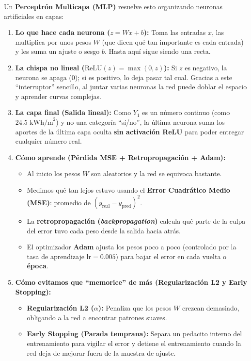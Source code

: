 \documentclass[11pt,a4paper]{article}
\begin{document}
Un \textbf{Perceptrón Multicapa (MLP)} resuelve esto organizando neuronas artificiales en capas:
\begin{enumerate}[leftmargin=1.5em,itemsep=4pt]
    \item \textbf{Lo que hace cada neurona ($z = Wx + b$):} Toma las entradas $x$, las multiplica por unos pesos $W$ (que dicen qué tan importante es cada entrada) y les suma un ajuste o sesgo $b$. Hasta aquí sigue siendo una recta.
    \item \textbf{La chispa no lineal ($\text{ReLU}(z) = \max(0, z)$):} Si $z$ es negativo, la neurona se apaga ($0$); si es positivo, lo deja pasar tal cual. Gracias a este ``interruptor'' sencillo, al juntar varias neuronas la red puede doblar el espacio y aprender curvas complejas.
    \item \textbf{La capa final (Salida lineal):} Como $Y_1$ es un número continuo (como $24.5\text{ kWh/m}^2$) y no una categoría ``sí/no'', la última neurona suma los aportes de la última capa oculta \textbf{sin activación ReLU} para poder entregar cualquier número real.
    \item \textbf{Cómo aprende (Pérdida MSE + Retropropagación + Adam):}
    \begin{itemize}[leftmargin=1.2em]
        \item Al inicio los pesos $W$ son aleatorios y la red se equivoca bastante.
        \item Medimos qué tan lejos estuvo usando el \textbf{Error Cuadrático Medio (MSE)}: promedio de $(y_{\text{real}} - y_{\text{pred}})^2$.
        \item La \textbf{retropropagación (\textit{backpropagation})} calcula qué parte de la culpa del error tuvo cada peso desde la salida hacia atrás.
        \item El optimizador \textbf{Adam} ajusta los pesos poco a poco (controlado por la tasa de aprendizaje $\text{lr} = 0.005$) para bajar el error en cada vuelta o \textbf{época}.
    \end{itemize}
    \item \textbf{Cómo evitamos que ``memorice'' de más (Regularización L2 y Early Stopping):}
    \begin{itemize}[leftmargin=1.2em]
        \item \textbf{Regularización L2 ($\alpha$):} Penaliza que los pesos $W$ crezcan demasiado, obligando a la red a encontrar patrones suaves.
        \item \textbf{Early Stopping (Parada temprana):} Separa un pedacito interno del entrenamiento para vigilar el error y detiene el entrenamiento cuando la red deja de mejorar fuera de la muestra de ajuste.
    \end{itemize}
\end{enumerate}
\end{document}
